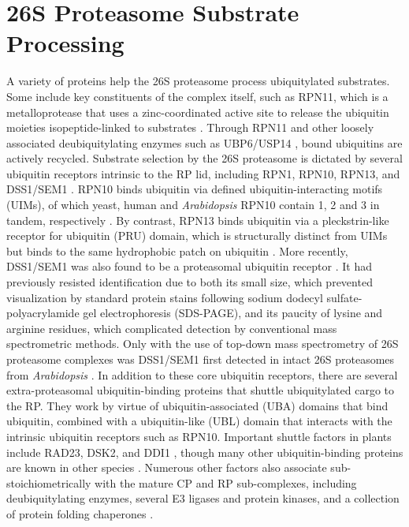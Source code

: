 \section{26S Proteasome Substrate Processing}
A variety of proteins help the 26S proteasome process ubiquitylated substrates. Some include key constituents of the complex itself, such as RPN11, which is a metalloprotease that uses a zinc-coordinated active site to release the ubiquitin moieties isopeptide-linked to substrates \citep{verma02, worden14}.  Through RPN11 and other loosely associated deubiquitylating enzymes such as UBP6/USP14 \citep{hanna06, sakata11}, bound ubiquitins are actively recycled. 
Substrate selection by the 26S proteasome is dictated by several ubiquitin receptors intrinsic to the RP lid, including RPN1, RPN10, RPN13, and DSS1/SEM1 \citep{elsasser02, fatimababy10, finley09, lin11, paraskevopoulos14, sakata12, shi16, van96}.  RPN10 binds ubiquitin via defined ubiquitin-interacting motifs (UIMs), of which yeast, human and \textit{Arabidopsis} RPN10 contain 1, 2 and 3 in tandem, respectively \citep{fatimababy10, finley09, fu98, lin11, van96}.  By contrast, RPN13 binds ubiquitin via a pleckstrin-like receptor for ubiquitin (PRU) domain, which is structurally distinct from UIMs but binds to the same hydrophobic patch on ubiquitin \citep{husnjak08, schreiner08}.  More recently, DSS1/SEM1 was also found to be a proteasomal ubiquitin receptor \citep{paraskevopoulos14}.  It had previously resisted identification due to both its small size, which prevented visualization by standard protein stains following sodium dodecyl sulfate-polyacrylamide gel electrophoresis (SDS-PAGE), and its paucity of lysine and arginine residues, which complicated detection by conventional mass spectrometric methods.  Only with the use of top-down mass spectrometry of 26S proteasome complexes was DSS1/SEM1 first detected in intact 26S proteasomes from \textit{Arabidopsis} \citep{russell13}.  
In addition to these core ubiquitin receptors, there are several extra-proteasomal ubiquitin-binding proteins that shuttle ubiquitylated cargo to the RP.  They work by virtue of ubiquitin-associated (UBA) domains that bind ubiquitin, combined with a ubiquitin-like (UBL) domain that interacts with the intrinsic ubiquitin receptors such as RPN10.  Important shuttle factors in plants include RAD23, DSK2, and DDI1 \citep{farmer10, fatimababy10, finley09, lin11}, though many other ubiquitin-binding proteins are known in other species \citep{husnjak12}.  Numerous other factors also associate sub-stoichiometrically with the mature CP and RP sub-complexes, including deubiquitylating enzymes, several E3 ligases and protein kinases, and a collection of protein folding chaperones \citep{besche14, book10, leggett02, xie00}.

